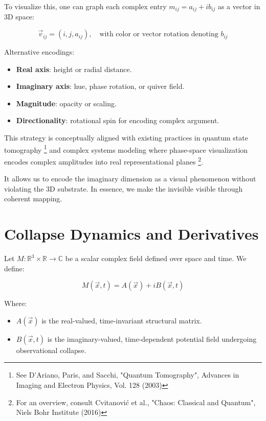 To visualize this, one can graph each complex entry $m_{ij} = a_{ij} + ib_{ij}$ as a vector in 3D space:

\[
\vec{v}_{ij} = (i, j, a_{ij}), \quad \text{with color or vector rotation denoting } b_{ij}
\]

Alternative encodings:
\begin{itemize}
    \item \textbf{Real axis}: height or radial distance. \cite{imaginary_meta} 
    \item \textbf{Imaginary axis}: hue, phase rotation, or quiver field. \cite{imaginary_meta} 
    \item \textbf{Magnitude}: opacity or scaling. 
    \item \textbf{Directionality}: rotational spin for encoding complex argument. \cite{imaginary_meta} 
\end{itemize}

This strategy is conceptually aligned with existing practices in quantum state tomography \footnote{See D'Ariano, Paris, and Sacchi, "Quantum Tomography", Advances in Imaging and Electron Physics, Vol. 128 (2003)} and complex systems modeling where phase-space visualization encodes complex amplitudes into real representational planes \footnote{For an overview, consult Cvitanovi\'c et al., "Chaos: Classical and Quantum", Niels Bohr Institute (2016)}. \cite{imaginary_meta} 

It allows us to encode the imaginary dimension as a visual phenomenon without violating the 3D substrate. In essence, we make the invisible visible through coherent mapping. 

\section{Collapse Dynamics and Derivatives}

Let $M : \mathbb{R}^3 \times \mathbb{R} \rightarrow \mathbb{C}$ be a scalar complex field defined over space and time. \cite{imaginary_meta} We define:

\[
M(\vec{x}, t) = A(\vec{x}) + i B(\vec{x}, t)
\]

Where:
\begin{itemize}
    \item $A(\vec{x})$ is the real-valued, time-invariant structural matrix. 
    \item $B(\vec{x}, t)$ is the imaginary-valued, time-dependent potential field undergoing observational collapse. \cite{imaginary_meta} 
\end{itemize}

